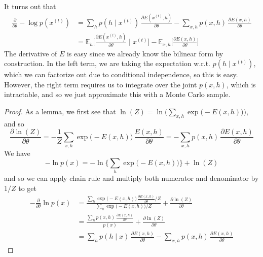   \begin{theorem}
    It turns out that
    \begin{align*} 
      \frac{\partial}{\partial \theta} - \log p(x^{(t)}) & = \sum_{h}  p(h \mid x^{(t)}) \, \frac{ \partial E(x^{(t)}, h)}{\partial \theta} - \sum_{x, h} p(x, h) \, \frac{\partial E(x, h)}{\partial \theta} \\
                                                                               & = \mathbb{E}_{h} \bigg[ \frac{\partial E( x^{(t)}, h)}{\partial \theta} \; \bigg| \; x^{(t)} \bigg] - \mathbb{E}_{x, h} \bigg[ \frac{\partial E(x, h)}{\partial \theta} \bigg]  
    \end{align*}
    The derivative of $E$ is easy since we already know the bilinear form by construction. In the left term, we are taking the expectation w.r.t. $p(h \mid x^{(t)})$, which we can factorize out due to conditional independence, so this is easy. However, the right term requires us to integrate over the joint $p(x, h)$, which is intractable, and so we just approximate this with a Monte Carlo sample. 
  \end{theorem}
  \begin{proof}
    As a lemma, we first see that $\ln(Z) = \ln \big( \sum_{x, h} \exp \big( - E(x, h) \big) \big)$, and so
    \begin{equation}
      \frac{\partial \ln(Z)}{\partial \theta} = -\frac{1}{Z} \sum_{x, h} \exp \big(-E(x, h)\big) \, \frac{E(x, h)}{\partial \theta} = - \sum_{x, h} p(x, h) \, \frac{\partial E(x, h)}{\partial \theta}
    \end{equation}
    We have 
    \begin{equation} 
      -\ln p(x) = - \ln \bigg\{ \sum_{h} \exp \big( -E(x, h) \big) \bigg\} + \ln(Z)
    \end{equation}
    and so we can apply chain rule and multiply both numerator and denominator by $1/Z$ to get 
    \begin{align} 
      -\frac{\partial}{\partial \theta} \ln p(x) & = \frac{\sum_{h} \exp \big( -E(x, h) \big) \, \frac{\partial E(x, h)}{\partial \theta} / Z}{\sum_{h} \exp \big( -E (x, h) \big) / Z} + \frac{\partial \ln(Z)}{\partial \theta} \\
                                                                       & = \frac{\sum_{h} p(x, h) \, \frac{\partial E(x, h)}{\partial \theta}}{p(x)} + \frac{\partial \ln(Z)}{\partial \theta} \\
                                                                       & = \sum_{h} p(h \mid x) \, \frac{\partial E(x, h)}{\partial \theta} - \sum_{x, h} p(x, h) \, \frac{\partial E(x, h)}{\partial \theta} 
    \end{align}
  \end{proof} 

